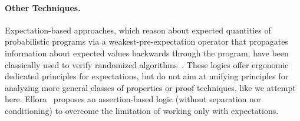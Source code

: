 \paragraph{\bfseries Other Techniques.}
Expectation-based approaches, which reason about expected quantities of probabilistic programs via a weakest-pre-expectation operator that propagates information about expected values backwards through the program, have been classically used to verify randomized algorithms~\cite{kozen1983PDL,Morgan:1996,kaminski2016weakest,kaminski2019thesis,aguirre2021pre,Bartocci2022moment}.
These logics offer ergonomic dedicated principles for expectations, but do not aim at unifying principles for analyzing more general classes of properties or proof techniques, like we attempt here.
Ellora~\cite{barthe2016ellora} proposes an assertion-based logic (without separation nor conditioning) to overcome the limitation of working only with expectations.

